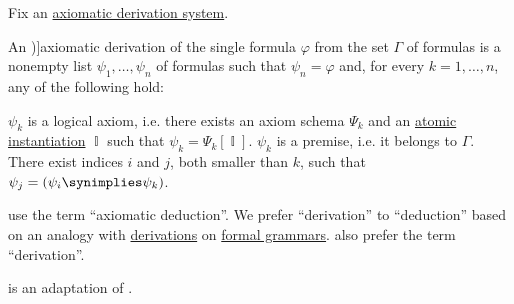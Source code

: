 \begin{definition}\label{def:propositional_axiomatic_derivation}
  Fix an \hyperref[def:propositional_axiomatic_derivation_system]{axiomatic derivation system}.

  An \term[ru=вывод (\cite[def. 1.2.4]{Герасимов2014Вычислимость})]{axiomatic derivation} of the single formula \( \varphi \) from the set \( \Gamma \) of formulas is a nonempty list \( \psi_1, \ldots, \psi_n \) of formulas such that \( \psi_n = \varphi \) and, for every \( k = 1, \ldots, n \), any of the following hold:
  \begin{thmenum}
     \( \psi_k \) is a logical axiom, i.e. there exists an axiom schema \( \Psi_k \) and an \hyperref[def:atomic_propositional_instantiation]{atomic instantiation} \( \BbbI \) such that \( \psi_k = \Psi_k[\BbbI] \).
     \( \psi_k \) is a premise, i.e. it belongs to \( \Gamma \).
     There exist indices \( i \) and \( j \), both smaller than \( k \), such that \( \psi_j = (\psi_i \synimplies \psi_k) \).
  \end{thmenum}
\end{definition}
\begin{comments}
  \item \Textcite[51]{TroelstraSchwichtenberg2000BasicProofTheory} use the term \enquote{axiomatic deduction}. We prefer \enquote{derivation} to \enquote{deduction} based on an analogy with \hyperref[def:formal_grammar/derivation]{derivations} on \hyperref[def:formal_grammar]{formal grammars}. \Textcite[115]{CitkinMuravitsky2022ConsequenceRelations} also prefer the term \enquote{derivation}.

  \item {} is an adaptation of .
\end{comments}

